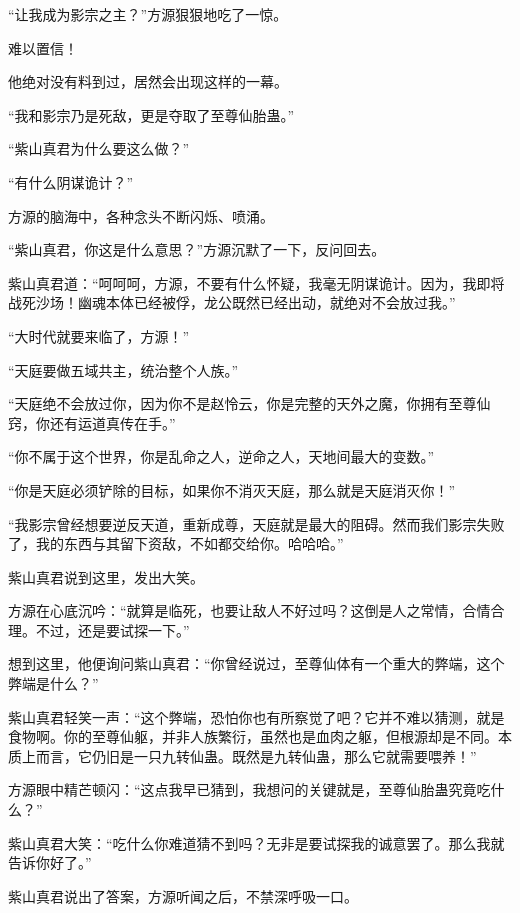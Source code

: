
\begin{this_body}



“让我成为影宗之主？”方源狠狠地吃了一惊。

难以置信！

他绝对没有料到过，居然会出现这样的一幕。

“我和影宗乃是死敌，更是夺取了至尊仙胎蛊。”

“紫山真君为什么要这么做？”

“有什么阴谋诡计？”

方源的脑海中，各种念头不断闪烁、喷涌。

“紫山真君，你这是什么意思？”方源沉默了一下，反问回去。

紫山真君道：“呵呵呵，方源，不要有什么怀疑，我毫无阴谋诡计。因为，我即将战死沙场！幽魂本体已经被俘，龙公既然已经出动，就绝对不会放过我。”

“大时代就要来临了，方源！”

“天庭要做五域共主，统治整个人族。”

“天庭绝不会放过你，因为你不是赵怜云，你是完整的天外之魔，你拥有至尊仙窍，你还有运道真传在手。”

“你不属于这个世界，你是乱命之人，逆命之人，天地间最大的变数。”

“你是天庭必须铲除的目标，如果你不消灭天庭，那么就是天庭消灭你！”

“我影宗曾经想要逆反天道，重新成尊，天庭就是最大的阻碍。然而我们影宗失败了，我的东西与其留下资敌，不如都交给你。哈哈哈。”

紫山真君说到这里，发出大笑。

方源在心底沉吟：“就算是临死，也要让敌人不好过吗？这倒是人之常情，合情合理。不过，还是要试探一下。”

想到这里，他便询问紫山真君：“你曾经说过，至尊仙体有一个重大的弊端，这个弊端是什么？”

紫山真君轻笑一声：“这个弊端，恐怕你也有所察觉了吧？它并不难以猜测，就是食物啊。你的至尊仙躯，并非人族繁衍，虽然也是血肉之躯，但根源却是不同。本质上而言，它仍旧是一只九转仙蛊。既然是九转仙蛊，那么它就需要喂养！”

方源眼中精芒顿闪：“这点我早已猜到，我想问的关键就是，至尊仙胎蛊究竟吃什么？”

紫山真君大笑：“吃什么你难道猜不到吗？无非是要试探我的诚意罢了。那么我就告诉你好了。”

紫山真君说出了答案，方源听闻之后，不禁深呼吸一口。


\end{this_body}
